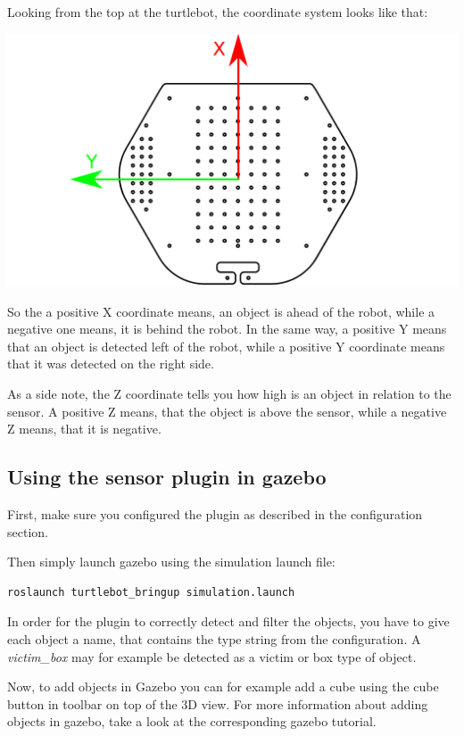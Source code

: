 Looking from the top at the turtlebot, the coordinate system looks like that:

\includegraphics[width=1.0\textwidth]{ttbtop.pdf}

So the a positive X coordinate means, an object is ahead of the robot, while a negative one means, it is behind the robot. In the same way, a positive Y means that an object is detected left of the robot, while a positive Y coordinate means that it was detected on the right side.

As a side note, the Z coordinate tells you how high is an object in relation to the sensor. A positive Z means, that the object is above the sensor, while a negative Z means, that it is negative.

\subsection{Using the sensor plugin in gazebo}

First, make sure you configured the plugin as described in the configuration section.

Then simply launch gazebo using the simulation launch file:

\begin{verbatim}
roslaunch turtlebot_bringup simulation.launch
\end{verbatim}

In order for the plugin to correctly detect and filter the objects, you have to give each object a name, that contains the type string from the configuration. A \textit{victim\_box} may for example be detected  as a victim or box type of object.

Now, to add objects in Gazebo you can for example add a cube using the cube button in toolbar on top of the 3D view. For more information about adding objects in gazebo, take a look at the corresponding gazebo tutorial.

